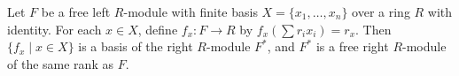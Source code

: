 Let $F$ be a free left $R$-module with finite basis $X = \{x_1,\ldots,x_n\}$ over a ring $R$ with identity. For each $x \in X$, define $f_x : F \to R$ by $f_x(\sum r_i x_i) = r_x$. Then $\{f_x \mid x \in X\}$ is a basis of the right $R$-module $F^*$, and $F^*$ is a free right $R$-module of the same rank as $F$.

